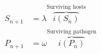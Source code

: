 \documentclass[10pt]{article}
\begin{document}
\begin{align*}\begin{aligned}
S_{n+1} &= \lambda \overbrace{i(S_{n})}^{\text{Surviving hosts}} \\
P_{n+1} &= \omega \overbrace{i(P_{n})}^{\text{Surviving pathogen}}
\end{aligned}\end{align*}
\end{document}
